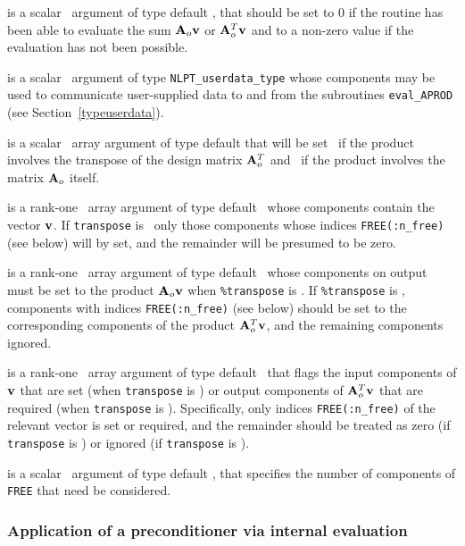 \documentclass{galahad}
\begin{document}
\begin{description}
 is a scalar \intentout\ argument of type default \integer,
that should be set to 0 if the routine has been able to evaluate the
sum ${\mathbf{A}}_o {\mathbf{v}}$ or ${\mathbf{A}}_o^T{\mathbf{v}}$
and to a non-zero value if the evaluation has not been possible.

 is a scalar \intentinout\ argument of type
{\tt NLPT\_userdata\_type} whose components may be used
to communicate user-supplied data to and from the subroutines
{\tt eval\_APROD}
(see Section~\ref{typeuserdata}).

 is a scalar \intentin\ array argument of type
default that will be set \true\ if the product involves the transpose
of the design matrix ${\mathbf{A}}_o^T$ and \false\ if the product involves
the matrix ${\mathbf{A}}_o$ itself.

 is a rank-one \intentin\ array argument of type default \realdp\
whose components contain the vector ${\mathbf{v}}$. If {\tt transpose} is \false\
only those components whose indices {\tt FREE(:n\_free)} (see below)
will by set, and the remainder will be presumed to be zero.

 is a rank-one \intentout\ array argument of type default \realdp\
whose components on output must be set to the
product ${\mathbf{A}}_o {\mathbf{v}}$ when {\tt \%transpose} is \false. If
{\tt \%transpose} is \true, components with indices {\tt FREE(:n\_free)}
(see below) should be set to the corresponding components of the
product ${\mathbf{A}}_o^T {\mathbf{v}}$, and the remaining components ignored.

\itt{FREE} is a rank-one \intentin\ array argument of
type default \integer\ that flags the input components of ${\mathbf{v}}$ that are set
(when {\tt transpose} is \false) or output components of ${\mathbf{A}}_o^T {\mathbf{v}}$ that
are required (when {\tt transpose} is \true). Specifically, only indices
{\tt FREE(:n\_free)} of the relevant vector is set or required, and the
remainder should be treated as zero (if {\tt transpose} is \false)
or ignored  (if {\tt transpose} is \true).

\itt{n\_free} is a scalar \intentin\ argument of type default \integer,
that specifies the number of components of {\tt FREE} that need be considered.

\end{description}


\subsubsection{Application of a preconditioner via internal evaluation
\label{prec}}
\end{document}

